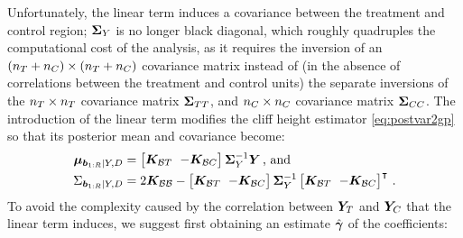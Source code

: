 \documentclass{article}
\begin{document}
Unfortunately, the linear term induces a covariance between the treatment and control region; \(\bm{\Sigma}_Y\) is no longer black diagonal, which roughly quadruples the computational cost of the analysis, as it requires the inversion of an \((n_T{}+n_C{}) \times (n_T{}+n_C{})\) covariance matrix instead of (in the absence of correlations between the treatment and control units) the separate inversions of the \(n_T{} \times n_T{}\) covariance matrix \(\bm{\Sigma}_{T T}\), and \(n_C{} \times n_C{}\) covariance matrix \(\bm{\Sigma}_{C C}\).
The introduction of the linear term modifies the cliff height estimator \autoref{eq:postvar2gp} so that its posterior mean and covariance become:
\begin{equation}
    \begin{split}
        \muvec_{\sentinels \mid Y, D} &= 
        \begingroup\SmallColSep
        \begin{bmatrix}
            \KBT & -\KBC
        \end{bmatrix}
        \SigmaMat_Y^{-1}
        \Yvec
        \endgroup
        \,\text{, and}\\
        \Sigma_{\sentinels \mid Y, D} &=
        \begingroup\SmallColSep
        2 \KBB -
        \begin{bmatrix}
            \KBT & -\KBC
        \end{bmatrix}
        \SigmaMat_Y^{-1}
        \begin{bmatrix}
            \KBT & -\KBC
        \end{bmatrix}\trans
        \endgroup
        \,.
    \end{split}
    \label{eq:cliff_with_covariates}
\end{equation}
To avoid the complexity caused by the correlation between \(\bm{Y}_{T}\) and \(\bm{Y}_{C}\) that the linear term induces, we suggest first obtaining an estimate \(\hat{\bm{\gamma}}\) of the coefficients:
\end{document}
